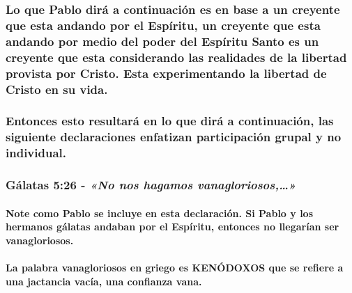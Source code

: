 \documentclass[11a pt,twoside]{article}
\newcommand{\scripture}[1]{%
  {\fontsize{12pt}{16pt}\selectfont\ScriptureFont\itshape #1}%
}
\let\oldsubsubsection\subsubsection
\renewcommand{\subsubsection}{\needspace{4\baselineskip}\oldsubsubsection}
\let\oldparagraph\paragraph
\renewcommand{\paragraph}{\needspace{3\baselineskip}\oldparagraph}
\begin{document}
\subsubsection{Lo que Pablo dirá a continuación es en base a un creyente
que esta andando por el Espíritu, un creyente que esta andando por medio
del poder del Espíritu Santo es un creyente que esta considerando las
realidades de la libertad provista por Cristo. Esta experimentando la
libertad de Cristo en su
vida.}\label{lo-que-pablo-diruxe1-a-continuaciuxf3n-es-en-base-a-un-creyente-que-esta-andando-por-el-espuxedritu-un-creyente-que-esta-andando-por-medio-del-poder-del-espuxedritu-santo-es-un-creyente-que-esta-considerando-las-realidades-de-la-libertad-provista-por-cristo.-esta-experimentando-la-libertad-de-cristo-en-su-vida.}

\subsubsection{Entonces esto resultará en lo que dirá a continuación,
las siguiente declaraciones enfatizan participación grupal y no
individual.}\label{entonces-esto-resultaruxe1-en-lo-que-diruxe1-a-continuaciuxf3n-las-siguiente-declaraciones-enfatizan-participaciuxf3n-grupal-y-no-individual.}

\subsubsection{\texorpdfstring{Gálatas 5:26 -
\scripture{«No nos hagamos vanagloriosos,…»}}{Gálatas 5:26 - }}\label{guxe1latas-526---no-nos-hagamos-vanagloriosos}

\paragraph{Note como Pablo se incluye en esta declaración. Si Pablo y
los hermanos gálatas andaban por el Espíritu, entonces no llegarían ser
vanagloriosos.}\label{note-como-pablo-se-incluye-en-esta-declaraciuxf3n.-si-pablo-y-los-hermanos-guxe1latas-andaban-por-el-espuxedritu-entonces-no-llegaruxedan-ser-vanagloriosos.}

\paragraph{La palabra vanagloriosos en griego es KENÓDOXOS que se
refiere a una jactancia vacía, una confianza
vana.}\label{la-palabra-vanagloriosos-en-griego-es-kenuxf3doxos-que-se-refiere-a-una-jactancia-vacuxeda-una-confianza-vana.}
\end{document}
